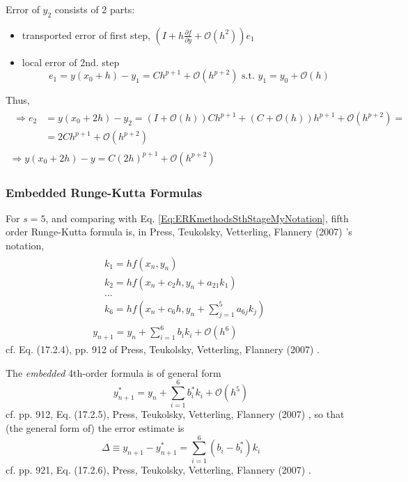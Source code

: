 \documentclass[10pt]{amsart}
\begin{document}
\begin{multicols*}{2}
Error of $y_2$ consists of 2 parts: 
\begin{itemize}
	\item transported error of first step, $(I + h \frac{\partial f}{\partial y} + \mathcal{O}(h^2)) e_1$ 
	\item local error of 2nd. step
	\[
	e_1 = y(x_0 + h) - y_1 = Ch^{p+1} + \mathcal{O}(h^{p+2}) \text{ s.t. } y_1 = y_0 + \mathcal{O}(h)
	\]
\end{itemize}
Thus,
\[
\begin{gathered}
	\begin{aligned}
		\Longrightarrow e_2 & = y(x_0 + 2h) - y_2 = (I + \mathcal{O}(h)) Ch^{p+1} + (C +\mathcal{O}(h))h^{p+1} + \mathcal{O}(h^{p+2}) = \\
		& = 2Ch^{p+1} + \mathcal{O}(h^{p+2})
	\end{aligned} \\
\Longrightarrow y(x_0 + 2h) - y = C(2h)^{p+1} + \mathcal{O}(h^{p+2})
\end{gathered}
\]

\subsubsection{Embedded Runge-Kutta Formulas}

For $s=5$, and comparing with Eq. \ref{Eq:ERKmethodsSthStageMyNotation}, fifth order Runge-Kutta formula is, in Press, Teukolsky, Vetterling, Flannery (2007) \cite{PTVF2007}'s notation,
\begin{equation}\label{Eq:FifthOrderRungeKuttaNumericalRecipes}
	\begin{gathered}
		\begin{aligned}
			& k_1 = h f(x_n, y_n) \\
			& k_2 = hf(x_n + c_2 h, y_n + a_{21} k_1) \\
			& \dots \\
			& k_6 = hf(x_n + c_6 h, y_n + \sum_{j=1}^5 a_{6j} k_j)
		\end{aligned} \\
	y_{n+1} = y_n + \sum_{i=1}^6 b_i k_i + \mathcal{O}(h^6)
	\end{gathered}
\end{equation} cf. Eq. (17.2.4),  pp. 912 of Press, Teukolsky, Vetterling, Flannery (2007) \cite{PTVF2007}.

The \emph{embedded} 4th-order formula is of general form
\begin{equation}\label{Eq:RK5Embedded4thOrderNumericalRecipes}
y^*_{n+1} = y_n + \sum_{i=1}^6 b_i^* k_i + \mathcal{O}(h^5)
\end{equation}
cf. pp. 912, Eq. (17.2.5), Press, Teukolsky, Vetterling, Flannery (2007) \cite{PTVF2007}, so that (the general form of) the error estimate is
\begin{equation}
	\Delta \equiv y_{n+1} - y^*_{n+1} = \sum_{i=1}^6 (b_i -b_i^*) k_i
\end{equation}
cf. pp. 921, Eq. (17.2.6), Press, Teukolsky, Vetterling, Flannery (2007) \cite{PTVF2007}.


\end{multicols*}
\end{document}
